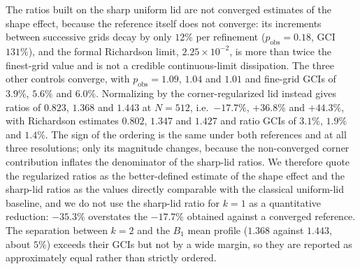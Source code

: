 \documentclass[11pt,a4paper]{article}
\newenvironment{chgdel}{\par\color{red}}{\par\color{black}}
\begin{document}
\begin{chgdel}
The ratios built on the sharp uniform lid are not converged estimates of the shape
effect, because the reference itself does not converge: its increments between
successive grids decay by only $12\%$ per refinement ($p_{\mathrm{obs}}=0.18$,
GCI $131\%$), and the formal Richardson limit, $2.25\times10^{-2}$, is more than
twice the finest-grid value and is not a credible continuous-limit dissipation.
The three other controls converge, with $p_{\mathrm{obs}}=1.09$, $1.04$ and
$1.01$ and fine-grid GCIs of $3.9\%$, $5.6\%$ and $6.0\%$. Normalizing by the
corner-regularized lid instead gives ratios of $0.823$, $1.368$ and $1.443$ at
$N=512$, i.e.\ $-17.7\%$, $+36.8\%$ and $+44.3\%$, with Richardson estimates
$0.802$, $1.347$ and $1.427$ and ratio GCIs of $3.1\%$, $1.9\%$ and $1.4\%$. The
sign of the ordering is the same under both references and at all three
resolutions; only its magnitude changes, because the non-converged corner
contribution inflates the denominator of the sharp-lid ratios. We therefore quote
the regularized ratios as the better-defined estimate of the shape effect and the
sharp-lid ratios as the values directly comparable with the classical uniform-lid
baseline, and we do not use the sharp-lid ratio for $k=1$ as a quantitative
reduction: $-35.3\%$ overstates the $-17.7\%$ obtained against a converged
reference. The separation between $k=2$ and the $B_1$ mean profile
($1.368$ against $1.443$, about $5\%$) exceeds their GCIs but not by a wide
margin, so they are reported as approximately equal rather than strictly ordered.
\end{chgdel}
\end{document}
